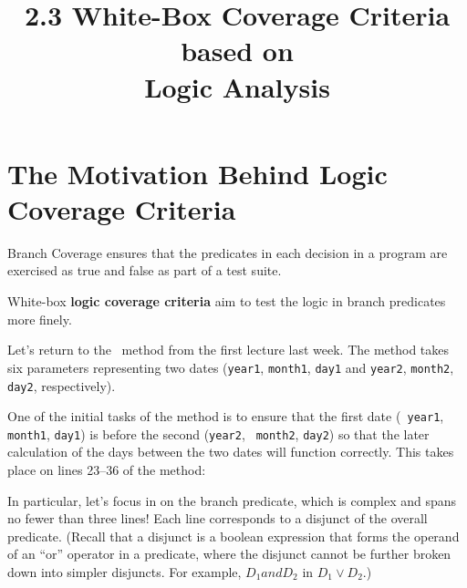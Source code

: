 



\title{2.3 White-Box Coverage Criteria based on\\ Logic Analysis}

\section{The Motivation Behind Logic Coverage Criteria}


Branch Coverage ensures that the predicates in each decision in a program are
exercised as true and false as part of a test suite. 

White-box {\bf logic coverage criteria} aim to test the logic in branch
predicates more finely.



Let's return to the \daysbetweentwodatesmethod~method from the first lecture
last week. The method takes six parameters representing two dates ({\tt year1},
{\tt month1}, {\tt day1} and {\tt year2}, {\tt month2}, {\tt day2},
respectively).

One of the initial tasks of the method is to ensure that the first date ({\tt
year1}, {\tt month1}, {\tt day1}) is before the second ({\tt year2}, {\tt
month2}, {\tt day2}) so that the later calculation of the days between the two
dates will function correctly. This takes place on lines 23--36 of the method:

\begin{center} 
\end{center}    

In particular, let's focus in on the branch predicate, which is complex and
spans no fewer than three lines! Each line corresponds to a disjunct of the
overall predicate.
%
(Recall that a disjunct is a boolean expression that forms the operand of an
``or'' operator in a predicate, where the disjunct  cannot be further broken
down into simpler disjuncts. For example, $D_1 and D_2$ in $D_1 \vee D_2$.)


